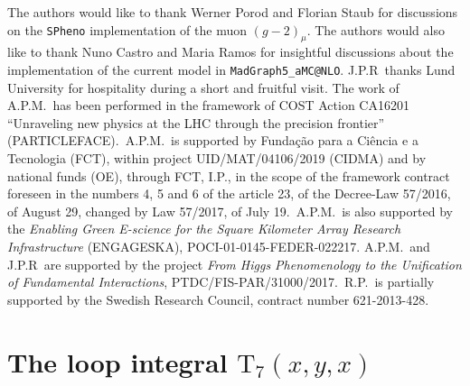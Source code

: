 \documentclass[a4paper,11pt]{article}
\renewcommand{\[}{\left[}
\renewcommand{\]}{\right]}
\newcommand{\ro}[1]{\textrm{#1}}
\begin{document}
The authors would like to thank Werner Porod and Florian Staub for discussions on 
the \texttt{SPheno} implementation of the muon $(g-2)_{\mu}$. The authors would also like to thank Nuno Castro and Maria Ramos for insightful discussions about the implementation of the current model in \texttt{MadGraph5\_aMC@NLO}. J.P.R~thanks Lund University for hospitality during a short and fruitful visit. The work of
A.P.M.~has been performed in the framework of COST Action CA16201
``Unraveling new physics at the LHC through the precision frontier'' 
(PARTICLEFACE).~A.P.M.~is supported by Funda\c{c}\~ao para a Ci\^encia 
e a Tecnologia (FCT), within project UID/MAT/04106/2019 (CIDMA) and 
by national funds (OE), through FCT, I.P., in the scope
of the framework contract foreseen in the numbers 4, 5 and 6
of the article 23, of the Decree-Law 57/2016, of August 29,
changed by Law 57/2017, of July 19.~A.P.M.~is also supported by 
the \textit{Enabling Green E-science for the Square Kilometer Array 
Research Infrastructure} (ENGAGESKA), POCI-01-0145-FEDER-022217. A.P.M.~and J.P.R~are supported by the project \textit{From Higgs Phenomenology to the Unification of 
Fundamental Interactions}, PTDC/FIS-PAR/31000/2017.~R.P.~is partially 
supported by the Swedish Research Council, contract number 621-2013-428.

\appendix

\section{The loop integral $\ro{T}_7(x,y,x)$}
\label{app:T7}
\end{document}
